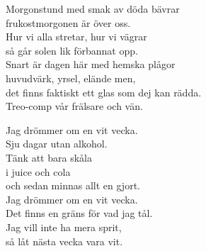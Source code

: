 \documentclass[a6paper, 10pt, twoside]{article}
\begin{document}
\begin{center}
\end{center}
\begin{lyrics}
Morgonstund med smak av döda bävrar\\
frukostmorgonen är över oss.\\
Hur vi alla stretar, hur vi vägrar\\
så går solen lik förbannat opp.
\vspace{5pt}\\
Snart är dagen här med hemska plågor\\
huvudvärk, yrsel, elände men,\\
det finns faktiskt ett glas som dej kan rädda.\\
Treo-comp vår frälsare och vän. 
\end{lyrics}
\vspace{40pt}
\begin{center}
\end{center}
\begin{lyrics}
Jag drömmer om en vit vecka.\\
Sju dagar utan alkohol.\\
Tänk att bara skåla\\
i juice och cola\\
och sedan minnas allt en gjort.
\vspace{5pt}\\
Jag drömmer om en vit vecka.\\
Det finns en gräns för vad jag tål.\\
Jag vill inte ha mera sprit,\\
så låt nästa vecka vara vit.
\end{lyrics}
\end{document}
